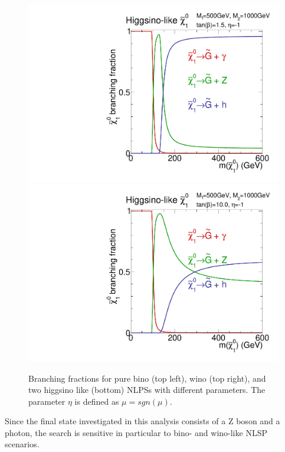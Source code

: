 \begin{enumerate}
\begin{figure}[htb]
 \includegraphics[width=\pairwidth]{figures/signal/higgsinoBranching1}
 \includegraphics[width=\pairwidth]{figures/signal/higgsinoBranching2}
 \caption{Branching fractions for pure bino (top left), wino (top right), and two higgsino like (bottom) NLPSs with different parameters. The parameter $\eta$ is defined as $\mu=sgn(\mu)$.}
 \label{fig:BRNLSP}
\end{figure}
Since the final state investigated in this analysis consists of a Z boson and a photon, the search is sensitive in particular to bino- and wino-like NLSP scenarios.\\

\end{enumerate}
